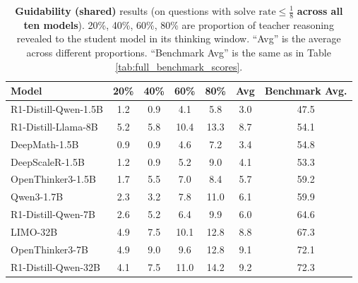 \documentclass{article} %
\begin{document}
\newpage

\begin{table}[ht!]
  \centering
  \small
  \begin{tabular}{lccccc|c}
    \toprule
    \textbf{Model} & \textbf{20\%} & \textbf{40\%} & \textbf{60\%} & \textbf{80\%} & \textbf{Avg} & \textbf{Benchmark Avg.} \\
    \midrule
    R1-Distill-Qwen-1.5B    & 1.2 & 0.9 & 4.1 & 5.8 & 3.0 & 47.5 \\
    R1-Distill-Llama-8B     & 5.2 & 5.8 & 10.4 & 13.3 & 8.7 & 54.1 \\
    DeepMath-1.5B           & 0.9 & 0.9 & 4.6 & 7.2 & 3.4 & 54.8 \\
    DeepScaleR-1.5B         & 1.2 & 0.9 & 5.2 & 9.0 & 4.1 & 53.3 \\
    OpenThinker3-1.5B       & 1.7 & 5.5 & 7.0 & 8.4 & 5.7 & 59.2 \\
    Qwen3-1.7B              & 2.3 & 3.2 & 7.8 & 11.0 & 6.1 & 59.9 \\
    \midrule
    R1-Distill-Qwen-7B      & 2.6 & 5.2 & 6.4 & 9.9 & 6.0 & 64.6 \\
    LIMO-32B                & 4.9 & 7.5 & 10.1 & 12.8 & 8.8 & 67.3 \\
    OpenThinker3-7B         & 4.9 & 9.0 & 9.6 & 12.8 & 9.1 & 72.1 \\
    R1-Distill-Qwen-32B     & 4.1 & 7.5 & 11.0 & 14.2 & 9.2 & 72.3 \\
    \bottomrule
  \end{tabular}
  \caption{\textbf{Guidability (shared)} results (on questions with $\text{solve rate} \leq \tfrac{1}{8}$ \textbf{across all ten models}). 20\%, 40\%, 60\%, 80\% are proportion of teacher reasoning revealed to the student model in its thinking window. ``Avg'' is the average across different proportions. ``Benchmark Avg'' is the same as in Table \ref{tab:full_benchmark_scores}.}
  \label{tab:guidability-shared}
\end{table}
\end{document}
